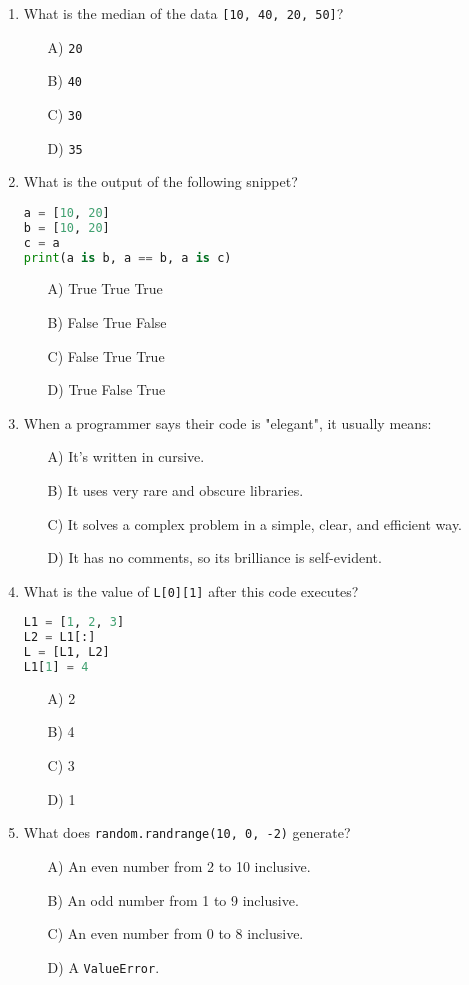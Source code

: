 \documentclass[9pt]{article}
\begin{document}
\begin{multicols}{2}
\begin{enumerate}
\item What is the median of the data \texttt{[10, 40, 20, 50]}?
\begin{enumerate}
    \item[A)] \texttt{20}
    \item[B)] \texttt{40}
    \item[C)] \texttt{30}
    \item[D)] \texttt{35}
\end{enumerate}

\item What is the output of the following snippet?
\begin{lstlisting}[language=Python]
a = [10, 20]
b = [10, 20]
c = a
print(a is b, a == b, a is c)
\end{lstlisting}
\begin{enumerate}
\item[A)] True True True
\item[B)] False True False
\item[C)] False True True
\item[D)] True False True
\end{enumerate}

\item When a programmer says their code is "elegant", it usually means:
\begin{enumerate}
    \item[A)] It's written in cursive.
    \item[B)] It uses very rare and obscure libraries.
    \item[C)] It solves a complex problem in a simple, clear, and efficient way.
    \item[D)] It has no comments, so its brilliance is self-evident.
\end{enumerate}

\item What is the value of \texttt{L[0][1]} after this code executes?
\begin{lstlisting}[language=Python]
L1 = [1, 2, 3]
L2 = L1[:]
L = [L1, L2]
L1[1] = 4
\end{lstlisting}
\begin{enumerate}
\item[A)] 2
\item[B)] 4
\item[C)] 3
\item[D)] 1
\end{enumerate}

\item What does \texttt{random.randrange(10, 0, -2)} generate?
\begin{enumerate}
    \item[A)] An even number from 2 to 10 inclusive.
    \item[B)] An odd number from 1 to 9 inclusive.
    \item[C)] An even number from 0 to 8 inclusive.
    \item[D)] A \texttt{ValueError}.
\end{enumerate}


\end{enumerate}
\end{multicols}
\end{document}
